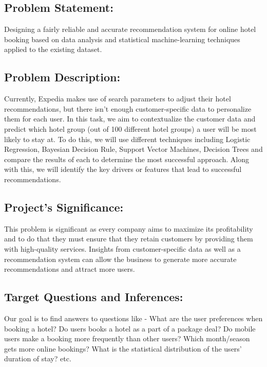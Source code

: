 \documentclass[conference]{IEEEtran}
\begin{document}
\subsection{Problem Statement:}
Designing a fairly reliable and accurate recommendation system for online hotel booking based on data analysis and statistical machine-learning techniques applied to the existing dataset. 
\subsection{Problem Description:}
Currently, Expedia makes use of search parameters to adjust their hotel recommendations, but there isn't enough customer-specific data to personalize them for each user. In this task, we aim to contextualize the customer data and predict which hotel group (out of 100 different hotel groups) a user will be most likely to stay at. To do this, we will use different techniques including Logistic Regression, Bayesian Decision Rule, Support Vector Machines, Decision Trees and compare the results of each to determine the most successful approach. Along with this, we will identify the key drivers or features that lead to successful recommendations.
\subsection{Project's Significance:}
This problem is significant as every company aims to maximize its profitability and to do that they must ensure that they retain customers by providing them with high-quality services. Insights from customer-specific data as well as a recommendation system can allow the business to generate more accurate recommendations and attract more users.  
\subsection{Target Questions and Inferences:}
Our goal is to find answers to questions like - What are the user preferences when booking a hotel? Do users books a hotel as a part of a package deal? Do mobile users make a booking more frequently than other users? Which month/season gets more online bookings? What is the statistical distribution of the users' duration of stay? etc. 
\end{document}
